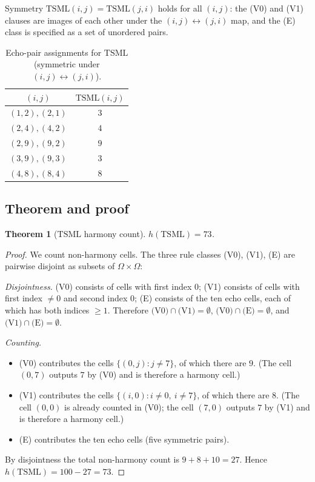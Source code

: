 \documentclass[11pt,reqno]{amsart}
\theoremstyle{plain}
\newtheorem{theorem}{Theorem}
\theoremstyle{definition}
\theoremstyle{remark}
\newcommand{\TSML}{\mathrm{TSML}}
\begin{document}
Symmetry $\TSML(i, j) = \TSML(j, i)$ holds for all $(i, j)$:
the (V0) and (V1) clauses are images of each other under the
$(i, j) \leftrightarrow (j, i)$ map, and the (E) class is
specified as a set of unordered pairs.

\begin{table}[h]
\caption{Echo-pair assignments for $\TSML$ (symmetric under $(i, j)
\leftrightarrow (j, i)$).}
\label{tab:tsml-rules}
\centering
\begin{tabular}{c|c}
$(i, j)$ & $\TSML(i, j)$ \\ \hline
$(1, 2), (2, 1)$ & $3$ \\
$(2, 4), (4, 2)$ & $4$ \\
$(2, 9), (9, 2)$ & $9$ \\
$(3, 9), (9, 3)$ & $3$ \\
$(4, 8), (8, 4)$ & $8$ \\
\end{tabular}
\end{table}

\subsection{Theorem and proof}

\begin{theorem}[$\TSML$ harmony count]\label{thm:tsml}
$h(\TSML) = 73$.
\end{theorem}

\begin{proof}
We count non-harmony cells. The three rule classes (V0), (V1), (E)
are pairwise disjoint as subsets of $\Omega \times \Omega$:

\emph{Disjointness.} (V0) consists of cells with first index $0$;
(V1) consists of cells with first index $\ne 0$ and second index
$0$; (E) consists of the ten echo cells, each of which has both
indices $\ge 1$. Therefore $\text{(V0)} \cap \text{(V1)} =
\emptyset$, $\text{(V0)} \cap \text{(E)} = \emptyset$, and
$\text{(V1)} \cap \text{(E)} = \emptyset$.

\emph{Counting.}
\begin{itemize}\setlength\itemsep{2pt}
\item (V0) contributes the cells $\{(0, j) : j \ne 7\}$, of which
there are $9$. (The cell $(0, 7)$ outputs $7$ by (V0) and is
therefore a harmony cell.)
\item (V1) contributes the cells $\{(i, 0) : i \ne 0,\ i \ne 7\}$,
of which there are $8$. (The cell $(0, 0)$ is already counted in
(V0); the cell $(7, 0)$ outputs $7$ by (V1) and is therefore a
harmony cell.)
\item (E) contributes the ten echo cells (five symmetric pairs).
\end{itemize}

By disjointness the total non-harmony count is
$9 + 8 + 10 = 27$. Hence $h(\TSML) = 100 - 27 = 73$.
\end{proof}
\end{document}
